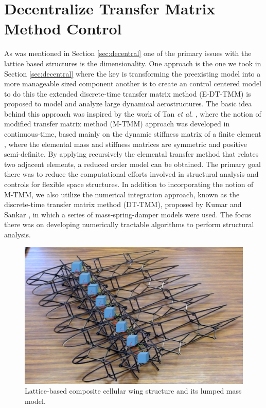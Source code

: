 \documentclass[11pt]{ucthesis}
\begin{document}
\section{Decentralize Transfer Matrix Method Control}
As was mentioned in Section \ref{sec:decentral} one of the primary issues with the lattice based structures is the dimensionality. One approach is the one we took in Section \ref{sec:decentral} where the key is transforming the preexisting model into a more manageable sized component another is to create an control centered model to do this the extended discrete-time transfer matrix method (E-DT-TMM) is proposed to model and analyze large dynamical aerostructures. The basic idea behind this approach was inspired by the work of Tan {\it et al.} \cite{tan1990modified}, where the notion of modified transfer matrix method (M-TMM) approach was developed in continuous-time, based mainly on the dynamic stiffness matrix of a finite element \cite{degen1985combined}, where the elemental mass and stiffness matrices are symmetric and positive semi-definite. By applying recursively the elemental transfer method that relates two adjacent elements, a reduced order model can be obtained. The primary goal there was to reduce the computational efforts involved in structural analysis and controls for flexible space structures. In addition to incorporating the notion of M-TMM, we also utilize the numerical integration approach, known as the discrete-time transfer matrix method (DT-TMM), proposed by Kumar and Sankar \cite{kumar1986new}, in which a series of mass-spring-damper models were used. The focus there was on developing numerically tractable algorithms to perform structural analysis.

\begin{figure}[thpb]
\centering
\includegraphics[width=1\linewidth]{Figures/WingLump.png}
\caption{Lattice-based composite cellular wing structure and its lumped mass model.}
\label{fig:lumpwing}
\end{figure}
\end{document}
